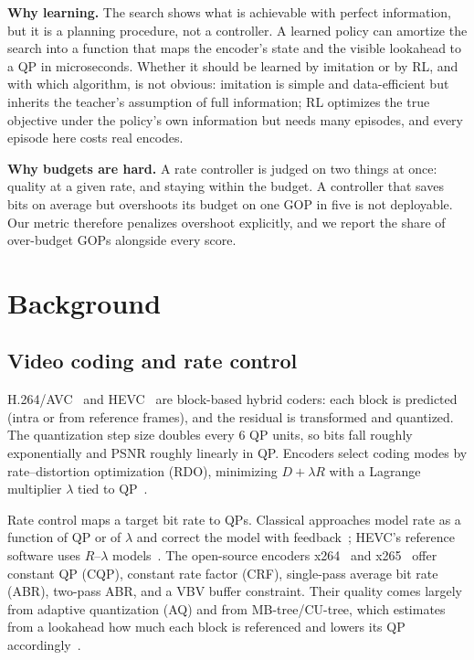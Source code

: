\documentclass[conference]{IEEEtran}
\begin{document}
\textbf{Why learning.} The search shows what is achievable with perfect information, but it is a planning procedure, not a controller. A learned policy can amortize the search into a function that maps the encoder's state and the visible lookahead to a QP in microseconds. Whether it should be learned by imitation or by RL, and with which algorithm, is not obvious: imitation is simple and data-efficient but inherits the teacher's assumption of full information; RL optimizes the true objective under the policy's own information but needs many episodes, and every episode here costs real encodes.

\textbf{Why budgets are hard.} A rate controller is judged on two things at once: quality at a given rate, and staying within the budget. A controller that saves bits on average but overshoots its budget on one GOP in five is not deployable. Our metric therefore penalizes overshoot explicitly, and we report the share of over-budget GOPs alongside every score.

\section{Background}
\subsection{Video coding and rate control}
H.264/AVC~\cite{wiegand2003h264} and HEVC~\cite{sullivan2012hevc} are block-based hybrid coders: each block is predicted (intra or from reference frames), and the residual is transformed and quantized. The quantization step size doubles every 6 QP units, so bits fall roughly exponentially and PSNR roughly linearly in QP. Encoders select coding modes by rate--distortion optimization (RDO), minimizing $D + \lambda R$ with a Lagrange multiplier $\lambda$ tied to QP~\cite{sullivan1998rdo,ortega1998rd}.

Rate control maps a target bit rate to QPs. Classical approaches model rate as a function of QP or of $\lambda$ and correct the model with feedback~\cite{chen2007rcsurvey}; HEVC's reference software uses $R$--$\lambda$ models~\cite{li2014lambda}. The open-source encoders x264~\cite{x264} and x265~\cite{x265} offer constant QP (CQP), constant rate factor (CRF), single-pass average bit rate (ABR), two-pass ABR, and a VBV buffer constraint. Their quality comes largely from adaptive quantization (AQ) and from MB-tree/CU-tree, which estimates from a lookahead how much each block is referenced and lowers its QP accordingly~\cite{garrett2009mbtree}.
\end{document}
